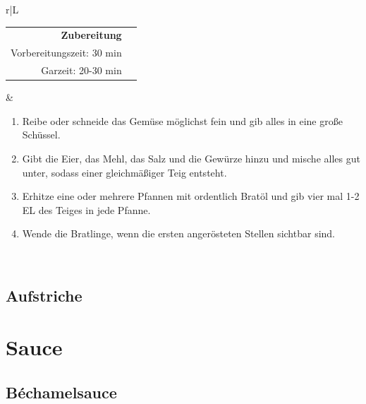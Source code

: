 \documentclass[a4paper, 12pt]{scrbook} 								%
\numberwithin{equation}{section} 									%
\begin{document}
	\begin{tabularx}{\textwidth}{r|L}
		\begin{tabular}[t]{rr}
			\textbf{Zubereitung}	\\
			Vorbereitungszeit: 30 min	\\
			Garzeit: 20-30 min		\\
		\end{tabular}			&	\begin{enumerate}[]
										\item Reibe oder schneide das Gemüse möglichst fein und gib alles in eine große Schüssel.
										\item Gibt die Eier, das Mehl, das Salz und die Gewürze hinzu und mische alles gut unter, sodass einer gleichmäßiger Teig entsteht.
										\item Erhitze eine oder mehrere Pfannen mit ordentlich Bratöl und gib vier mal 1-2 EL des Teiges in jede Pfanne.
										\item Wende die Bratlinge, wenn die ersten angerösteten Stellen sichtbar sind.
									\end{enumerate}	\\
	\end{tabularx}
	\newpage

	\section{Aufstriche}


\chapter{Sauce}


	\section{Béchamelsauce} \label{bechamelsauce}
\end{document}
